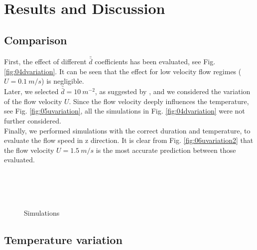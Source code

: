 
\section{Results and Discussion}
\label{section:resultsdiscussion}



\subsection{Comparison}
\label{subsection:comparison}

First, the effect of different $\bar{\bar{d}}$ coefficients has been evaluated, see Fig.
\ref{fig:04dvariation}.
It can be seen that the effect for low velocity flow regimes ($U = 0.1 ~m/s$) is
negligible.\\
Later, we selected $\bar{\bar{d}} = 10 ~m^{-2}$, as suggested by
\textcite{Permeability}, and we considered the variation of the flow velocity
$U$.
Since the flow velocity deeply influences the temperature, see Fig.
\ref{fig:05uvariation}, all the simulations in Fig. \ref{fig:04dvariation} were
not further considered.\\
Finally, we performed simulations with the correct duration and temperature, to
evaluate the flow speed in z direction.
It is clear from Fig. \ref{fig:06uvariation2} that the flow velocity $U = 1.5
~m/s$ is the most accurate prediction between those evaluated.

\begin{figure}[!h]
\centering
{} \\ 
 \\  
 \\  
\caption[Simulations]{Simulations}
\label{fig:simulations}
\end{figure}

\subsection{Temperature variation}
\label{subsection:temperaturevariation}

